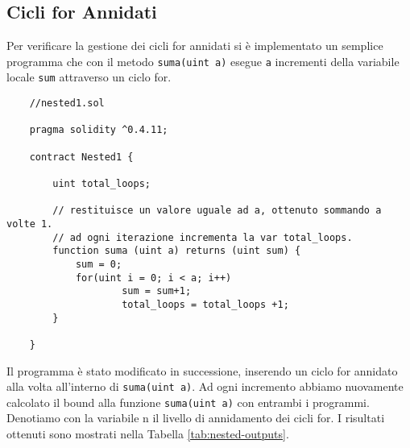     
    \subsection{Cicli for Annidati}
    
    Per verificare la gestione dei cicli for annidati si è implementato un semplice programma che con il metodo \verb|suma(uint a)| esegue \verb|a| incrementi della variabile locale \verb|sum| attraverso un ciclo for.
    
    \begin{minipage}{\linewidth}
    \begin{lstlisting}
    //nested1.sol

    pragma solidity ^0.4.11;

    contract Nested1 {

        uint total_loops;

        // restituisce un valore uguale ad a, ottenuto sommando a volte 1.
        // ad ogni iterazione incrementa la var total_loops.
        function suma (uint a) returns (uint sum) {
            sum = 0;
            for(uint i = 0; i < a; i++)
                    sum = sum+1;
                    total_loops = total_loops +1;          
        }

    }
    \end{lstlisting}
    \end{minipage}

    
    Il programma è stato modificato in successione, inserendo un ciclo for annidato alla volta all'interno di \verb|suma(uint a)|. Ad ogni incremento abbiamo nuovamente calcolato il bound alla funzione \verb|suma(uint a)| con entrambi i programmi. Denotiamo con la variabile n il livello di annidamento dei cicli for. I risultati ottenuti sono mostrati nella Tabella \ref{tab:nested-outputs}.
    
